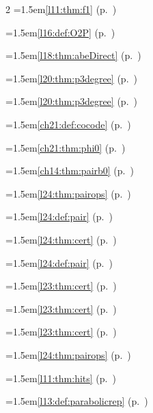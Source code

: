 \begin{multicols}{2}
\hangindent=1.5em\quad \ref{l11:thm:f1} (p.~\pageref{l11:thm:f1})\par
\hangindent=1.5em\quad \ref{l16:def:O2P} (p.~\pageref{l16:def:O2P})\par
\hangindent=1.5em\quad \ref{l18:thm:abeDirect} (p.~\pageref{l18:thm:abeDirect})\par
\par{}\par\nopagebreak\smallskip
\hangindent=1.5em\quad \ref{l20:thm:p3degree} (p.~\pageref{l20:thm:p3degree})\par
\hangindent=1.5em\quad \ref{l20:thm:p3degree} (p.~\pageref{l20:thm:p3degree})\par
\hangindent=1.5em\quad \ref{ch21:def:cocode} (p.~\pageref{ch21:def:cocode})\par
\hangindent=1.5em\quad \ref{ch21:thm:phi0} (p.~\pageref{ch21:thm:phi0})\par
\hangindent=1.5em\quad \ref{ch14:thm:pairb0} (p.~\pageref{ch14:thm:pairb0})\par
\hangindent=1.5em\quad \ref{l24:thm:pairops} (p.~\pageref{l24:thm:pairops})\par
\hangindent=1.5em\quad \ref{l24:def:pair} (p.~\pageref{l24:def:pair})\par
\hangindent=1.5em\quad \ref{l24:thm:cert} (p.~\pageref{l24:thm:cert})\par
\hangindent=1.5em\quad \ref{l24:def:pair} (p.~\pageref{l24:def:pair})\par
\hangindent=1.5em\quad \ref{l23:thm:cert} (p.~\pageref{l23:thm:cert})\par
\hangindent=1.5em\quad \ref{l23:thm:cert} (p.~\pageref{l23:thm:cert})\par
\hangindent=1.5em\quad \ref{l23:thm:cert} (p.~\pageref{l23:thm:cert})\par
\hangindent=1.5em\quad \ref{l24:thm:pairops} (p.~\pageref{l24:thm:pairops})\par
\hangindent=1.5em\quad \ref{l11:thm:hits} (p.~\pageref{l11:thm:hits})\par
\hangindent=1.5em\quad \ref{l13:def:parabolicrep} (p.~\pageref{l13:def:parabolicrep})\par

\end{multicols}
